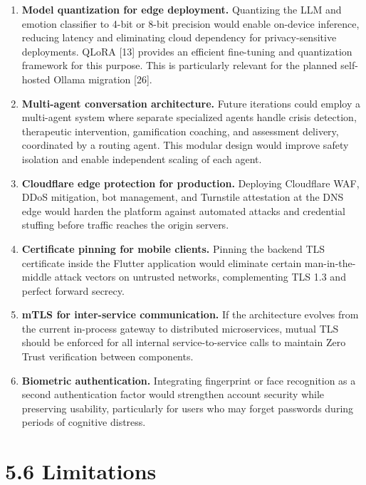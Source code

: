 \documentclass[
  letterpaper,
  12pt,
  a4paper,
  openany]{report}
\begin{document}
\begin{enumerate}
  participants over 6--12 months would provide statistically significant
  evidence of clinical efficacy. Outcome measures should include PHQ-9,
  GAD-7, and the Working Alliance Inventory.
\item
  \textbf{Model quantization for edge deployment.} Quantizing the LLM
  and emotion classifier to 4-bit or 8-bit precision would enable
  on-device inference, reducing latency and eliminating cloud dependency
  for privacy-sensitive deployments. QLoRA {[}13{]} provides an
  efficient fine-tuning and quantization framework for this purpose.
  This is particularly relevant for the planned self-hosted Ollama
  migration {[}26{]}.
\item
  \textbf{Multi-agent conversation architecture.} Future iterations
  could employ a multi-agent system where separate specialized agents
  handle crisis detection, therapeutic intervention, gamification
  coaching, and assessment delivery, coordinated by a routing agent.
  This modular design would improve safety isolation and enable
  independent scaling of each agent.
\item
  \textbf{Cloudflare edge protection for production.} Deploying
  Cloudflare WAF, DDoS mitigation, bot management, and Turnstile
  attestation at the DNS edge would harden the platform against
  automated attacks and credential stuffing before traffic reaches the
  origin servers.
\item
  \textbf{Certificate pinning for mobile clients.} Pinning the backend
  TLS certificate inside the Flutter application would eliminate certain
  man-in-the-middle attack vectors on untrusted networks, complementing
  TLS 1.3 and perfect forward secrecy.
\item
  \textbf{mTLS for inter-service communication.} If the architecture
  evolves from the current in-process gateway to distributed
  microservices, mutual TLS should be enforced for all internal
  service-to-service calls to maintain Zero Trust verification between
  components.
\item
  \textbf{Biometric authentication.} Integrating fingerprint or face
  recognition as a second authentication factor would strengthen account
  security while preserving usability, particularly for users who may
  forget passwords during periods of cognitive distress.
\end{enumerate}

\section{5.6 Limitations}\label{limitations}
\end{document}
